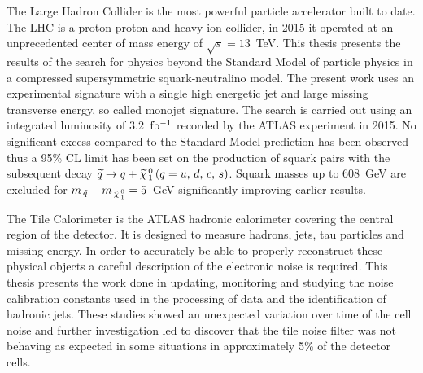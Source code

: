 The Large Hadron Collider is the most powerful particle accelerator built to
date. The LHC is a proton-proton and heavy ion collider, in 2015 it operated at
an unprecedented center of mass energy of $\sqrt{s} = 13$~TeV. This thesis
presents the results of the search for physics beyond the Standard Model of
particle physics in a compressed supersymmetric squark-neutralino model. The
present work uses an experimental signature with a single high energetic jet and
large missing transverse energy, so called monojet signature. The search is
carried out using an integrated luminosity of 3.2~$\mbox{fb$^{-1}$}$ recorded by the ATLAS
experiment in 2015. No significant excess compared to the Standard Model
prediction has been observed thus a 95\% CL limit has been set on the production
of squark pairs with the subsequent decay $\widetilde{q} \rightarrow q + \widetilde{\chi}_{\, 1}^{\, 0}\, (q = u,\, d,\, c,\, s)$. Squark masses up to
608~GeV are excluded for $m_{\, \tilde{q}} - m_{\, \tilde{\chi}_{\, 1}^{\, 0}} = 5$~GeV significantly
improving earlier results.

The Tile Calorimeter is the ATLAS hadronic calorimeter covering the central
region of the detector. It is designed to measure hadrons, jets, tau particles
and missing energy. In order to accurately be able to properly reconstruct these
physical objects a careful description of the electronic noise is required. This
thesis presents the work done in updating, monitoring and studying the noise
calibration constants used in the processing of data and the identification of
hadronic jets. These studies showed an unexpected variation over time of the
cell noise and further investigation led to discover that the tile noise filter
was not behaving as expected in some situations in approximately 5\% of the
detector cells.
